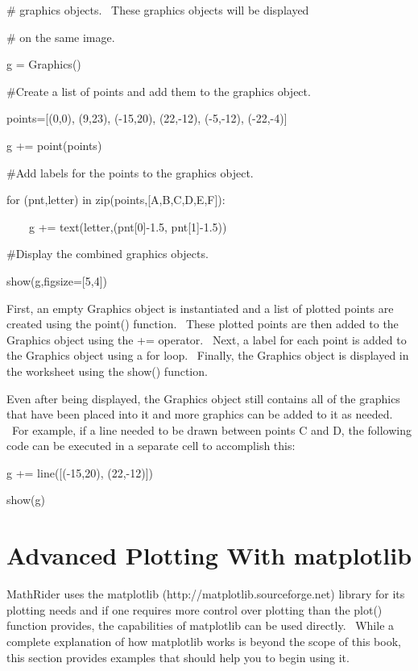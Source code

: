 \documentclass[12pt,twoside]{book}
\begin{document}
\# graphics objects. \ These graphics objects will be displayed

\# on the same image.

g = Graphics()


\bigskip

\#Create a list of points and add them to the graphics object.

points=[(0,0), (9,23), ({}-15,20), (22,{}-12), ({}-5,{}-12),
({}-22,{}-4)]

g += point(points)


\bigskip

\#Add labels for the points to the graphics object.

for (pnt,letter) in
zip(points,[{\textquotesingle}A{\textquotesingle},{\textquotesingle}B{\textquotesingle},{\textquotesingle}C{\textquotesingle},{\textquotesingle}D{\textquotesingle},{\textquotesingle}E{\textquotesingle},{\textquotesingle}F{\textquotesingle}]):

\ \ \ \ g += text(letter,(pnt[0]{}-1.5, pnt[1]{}-1.5))


\bigskip

\#Display the combined graphics objects.

show(g,figsize=[5,4])

{\textbar}


\bigskip

First, an empty Graphics object is instantiated and a list of plotted
points are created using the point() function. \ These plotted points
are then added to the Graphics object using the += operator. \ Next, a
label for each point is added to the Graphics object using a for loop.
\ Finally, the Graphics object is displayed in the worksheet using the
show() function.


\bigskip

Even after being displayed, the Graphics object still contains all of
the graphics that have been placed into it and more graphics can be
added to it as needed. \ For example, if a line needed to be drawn
between points C and D, the following code can be executed in a
separate cell to accomplish this:


\bigskip

g += line([({}-15,20), (22,{}-12)])

show(g)

{\textbar}


\bigskip


\bigskip

\section[Advanced Plotting With matplotlib]{Advanced
Plotting With matplotlib}
MathRider uses the matplotlib (http://matplotlib.sourceforge.net)
library for its plotting needs and if one requires more control over
plotting than the plot() function provides, the capabilities of
matplotlib can be used directly. \ While a complete explanation of how
matplotlib works is beyond the scope of this book, this section
provides examples that should help you to begin using it.
\end{document}
